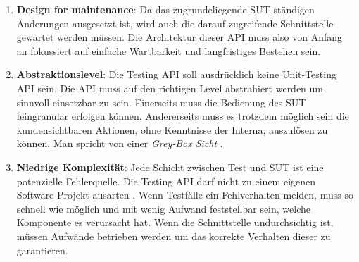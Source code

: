 \begin{enumerate}
\item \textbf{Design for maintenance}: Da das zugrundeliegende \Gls{SUT} ständigen Änderungen ausgesetzt ist, wird auch die darauf zugreifende Schnittstelle gewartet werden müssen. Die Architektur dieser API muss also von Anfang an fokussiert auf einfache Wartbarkeit und langfristiges Bestehen sein.
\item \textbf{Abstraktionslevel}: Die Testing API soll ausdrücklich keine Unit-Testing API sein. Die API muss auf den richtigen Level abstrahiert werden um sinnvoll einsetzbar zu sein. Einerseits muss die Bedienung des \Gls{SUT} feingranular erfolgen können. Andererseits muss es trotzdem möglich sein die kundensichtbaren Aktionen, ohne Kenntnisse der Interna, auszulösen zu können. Man spricht von einer \textit{Grey-Box Sicht} \cite{tyler_black-box_2004}.
\item \textbf{Niedrige Komplexität}: Jede Schicht zwischen Test und \Gls{SUT} ist eine potenzielle Fehlerquelle. Die Testing API darf nicht zu einem eigenen Software-Projekt ausarten . Wenn Testfälle ein Fehlverhalten melden, muss so schnell wie möglich und mit wenig Aufwand feststellbar sein, welche Komponente es verursacht hat. Wenn die Schnittstelle undurchsichtig ist, müssen Aufwände betrieben werden um das korrekte Verhalten dieser zu garantieren.
\end{enumerate}

